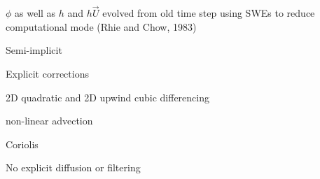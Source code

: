 \begin{slide}
\begin{list0}
\item $\phi$ as well as $h$ and $h\vec{U}$ evolved from old time step using SWEs to reduce computational mode (Rhie and Chow, 1983)

\item Semi-implicit

\item Explicit corrections
\begin{minipage}[t]{0.7\linewidth}\raggedright\begin{list2m}
\item 2D quadratic and 2D upwind cubic differencing
\item non-linear advection
\item Coriolis
\end{list2m}\end{minipage}

\item No explicit diffusion or filtering

\end{list0}

\end{slide}
